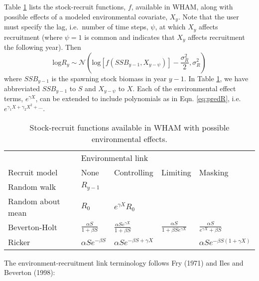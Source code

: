 \documentclass[]{article}
\begin{document}
Table \ref{tab:SRmodels} lists the stock-recruit functions, \(f\),
available in WHAM, along with possible effects of a modeled
environmental covariate, \(X_y\). Note that the user must specify the
lag, i.e.~number of time steps, \(\psi\), at which \(X_y\) affects
recruitment (where \(\psi=1\) is common and indicates that \(X_y\)
affects recruitment the following year). Then
\[\text{log}R_y \sim \mathcal{N} \left( \text{log} \left[ f(SSB_{y-1}, X_{y-\psi}) \right] - \frac{\sigma^2_R}{2}, \sigma^2_R \right)\]
where \(SSB_{y-1}\) is the spawning stock biomass in year \(y-1\). In
Table \ref{tab:SRmodels}, we have abbreviated \(SSB_{y-1}\) to \(S\) and
\(X_{y-\psi}\) to \(X\). Each of the environmental effect terms,
\(e^{\gamma X}\), can be extended to include polynomials as in Eqn.
\ref{eq:predR}, i.e. \(e^{\gamma_1 X + \gamma_2 X^2 + \dots}\).

\bigskip

\setcounter{table}{0}
\renewcommand{\thetable}{A\arabic{table}}
\renewcommand{\arraystretch}{1.5}

\begin{table}[!h]

\caption{\label{tab:SRmodels}Stock-recruit functions available in WHAM with possible environmental effects.}
\centering
\begin{tabular}[t]{lllll}
\toprule
\multicolumn{1}{l}{ } & \multicolumn{4}{l}{Environmental link} \\
\cmidrule(l{3pt}r{3pt}){2-5}
Recruit model & None & Controlling & Limiting & Masking\\
\midrule
Random walk & $R_{y-1}$ &  &  & \\
Random about mean & $R_0$ & $e^{\gamma X} R_0$ &  & \\
Beverton-Holt & $\frac{\alpha S}{1 + \beta S}$ & $\frac{\alpha S e^{\gamma X}}{1 + \beta S}$ & $\frac{\alpha S}{1 + \beta S e^{\gamma X}}$ & $\frac{\alpha S}{e^{\gamma X} + \beta S}$\\
Ricker & $\alpha S e^{-\beta S}$ & $\alpha S e^{-\beta S + \gamma X}$ &  & $\alpha S e^{-\beta S (1 + \gamma X)}$\\
\bottomrule
\end{tabular}
\end{table}

\setcounter{table}{0}
\renewcommand{\thetable}{\arabic{table}}
\renewcommand{\arraystretch}{1}

The environment-recruitment link terminology follows Fry (1971) and Iles
and Beverton (1998):
\end{document}
